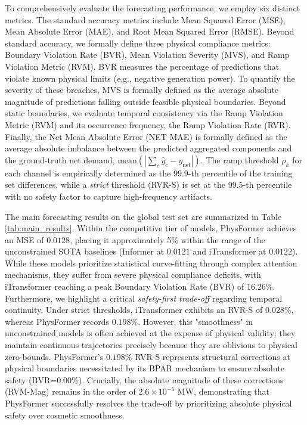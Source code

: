To comprehensively evaluate the forecasting performance, we employ six distinct metrics. The standard accuracy metrics include Mean Squared Error (MSE), Mean Absolute Error (MAE), and Root Mean Squared Error (RMSE). Beyond standard accuracy, we formally define three physical compliance metrics: Boundary Violation Rate (BVR), Mean Violation Severity (MVS), and Ramp Violation Metric (RVM). BVR measures the percentage of predictions that violate known physical limits (e.g., negative generation power). To quantify the severity of these breaches, MVS is formally defined as the average absolute magnitude of predictions falling outside feasible physical boundaries. Beyond static boundaries, we evaluate temporal consistency via the Ramp Violation Metric (RVM) and its occurrence frequency, the Ramp Violation Rate (RVR). Finally, the Net Mean Absolute Error (NET MAE) is formally defined as the average absolute imbalance between the predicted aggregated components and the ground-truth net demand, $\text{mean}(|\sum_c \hat{y}_c - y_{\text{net}}|)$. The ramp threshold $\rho_k$ for each channel is empirically determined as the $99.9$-th percentile of the training set differences, while a \textit{strict} threshold (RVR-S) is set at the $99.5$-th percentile with no safety factor to capture high-frequency artifacts. 

The main forecasting results on the global test set are summarized in Table \ref{tab:main_results}. Within the competitive tier of models, PhysFormer achieves an MSE of $0.0128$, placing it approximately 5\% within the range of the unconstrained SOTA baselines (Informer at $0.0121$ and iTransformer at $0.0122$). While these models prioritize statistical curve-fitting through complex attention mechanisms, they suffer from severe physical compliance deficits, with iTransformer reaching a peak Boundary Violation Rate (BVR) of $16.26\%$. Furthermore, we highlight a critical \textit{safety-first trade-off} regarding temporal continuity. Under strict thresholds, iTransformer exhibits an RVR-S of $0.028\%$, whereas PhysFormer records $0.198\%$. However, this "smoothness" in unconstrained models is often achieved at the expense of physical validity; they maintain continuous trajectories precisely because they are oblivious to physical zero-bounds. PhysFormer's $0.198\%$ RVR-S represents structural corrections at physical boundaries necessitated by its BPAR mechanism to ensure absolute safety (BVR=0.00\%). Crucially, the absolute magnitude of these corrections (RVM-Mag) remains in the order of $2.6 \times 10^{-5}$ MW, demonstrating that PhysFormer successfully resolves the trade-off by prioritizing absolute physical safety over cosmetic smoothness.

